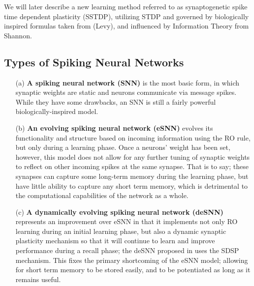 \documentclass[journal]{./sty/IEEEtran}
\begin{document}
We will later describe a new learning method referred to as synaptogenetic spike time dependent plasticity (SSTDP), utilizing STDP and governed by biologically inspired formulas taken from (Levy), and influenced by Information Theory from Shannon.

\subsection{Types of Spiking Neural Networks}
\begin{itemize}
\item[(a)] {\bf A spiking neural network (SNN)} is the most basic form, 
in which synaptic weights are static and neurons communicate via message spikes.
While they have some drawbacks, an SNN is still a fairly powerful biologically-inspired model.
\item[(b)] {\bf An evolving spiking neural network (eSNN)} evolves its functionality and 
structure based on incoming information using the RO rule, 
but only during a learning phase.
Once a neurons' weight has been set, however, this model does not allow 
for any further tuning of synaptic weights to reflect on other incoming spikes at the same synapse. 
That is to say; these synapses can capture some long-term memory during the learning phase, 
but have little ability to capture any short term memory, which is detrimental to the computational 
capabilities of the network as a whole. \cite{deSNN:Kasabov}
\item[(c)] {\bf A dynamically evolving spiking neural network (deSNN)} represents an improvement 
over eSNN in that it implements not only RO learning during an initial learning phase, 
but also a dynamic synaptic plasticity mechanism so that it will continue to learn and 
improve performance during a recall phase; the deSNN proposed in \cite{deSNN:Kasabov} 
uses the SDSP mechanism. 
This fixes the primary shortcoming of the eSNN model; 
allowing for short term memory to be stored easily, 
and to be potentiated as long as it remains useful\cite{deSNN:Kasabov}. 
\end{itemize}
\end{document}
